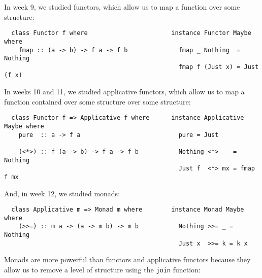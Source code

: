 \documentclass[a4paper,10pt,addpoints]{exam}
\begin{document}
\begin{center}
\end{center}

\vspace{0.1in}


\vspace{0.2in}

\begin{questions}


  \bonusquestion[1]

  In week 9, we studied functors, which allow us to map a function
  over some structure:

  \begin{verbatim}
  class Functor f where                       instance Functor Maybe where
    fmap :: (a -> b) -> f a -> f b              fmap _ Nothing  = Nothing
                                                fmap f (Just x) = Just (f x)
  \end{verbatim}

  In weeks 10 and 11, we studied applicative functors, which allow us
  to map a function contained over some structure over some structure:

  \begin{verbatim}
  class Functor f => Applicative f where      instance Applicative Maybe where
    pure  :: a -> f a                           pure = Just

    (<*>) :: f (a -> b) -> f a -> f b           Nothing <*> _  = Nothing
                                                Just f  <*> mx = fmap f mx
  \end{verbatim}

  And, in week 12, we studied monads:

  \begin{verbatim}
  class Applicative m => Monad m where        instance Monad Maybe where
    (>>=) :: m a -> (a -> m b) -> m b           Nothing >>= _ = Nothing
                                                Just x  >>= k = k x
  \end{verbatim}

  Monads are more powerful than functors and applicative functors
  because they allow us to remove a level of structure using the
  \texttt{join} function:


\end{questions}
\end{document}
